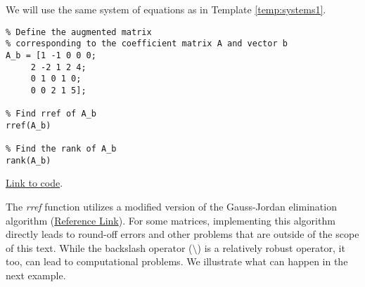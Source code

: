 \documentclass{ximera}
\begin{document}
\begin{template}\label{temp:rref}
We will use the same system of equations as in Template \ref{temp:systems1}.
    \begin{verbatim}
% Define the augmented matrix 
% corresponding to the coefficient matrix A and vector b
A_b = [1 -1 0 0 0;
     2 -2 1 2 4;
     0 1 0 1 0;
     0 0 2 1 5];
     
% Find rref of A_b
rref(A_b)

% Find the rank of A_b
rank(A_b)
    \end{verbatim}

\href{https://sagecell.sagemath.org/?z=eJxFjsEKwjAMhu-FvsN_Gehh0A49iYfB8CVEpOvSWWSt1Co-vumkmBCS_-cjSYOBnA-EfCOY17xQyDRhMTn5D2xMiZ6PGCYfZuS4UjaSc956JivXw4QJb7I5JoxS9NcRR5w1Wg1V8iAFSnRoO2huu-oo6F_9DYXC7C_VkaLByfMBfsYhOvB6KYrY8LSVgoUJ91V8ASwdNw8=&lang=octave&interacts=eJyLjgUAARUAuQ==}{Link to code}.    
\end{template}

\begin{warning}
    The \emph{rref} function utilizes a modified version of the Gauss-Jordan elimination algorithm (\href{https://www.mathworks.com/help/matlab/ref/rref.html}{Reference Link}).  For some matrices, implementing this algorithm directly leads to round-off errors and other problems that are outside of the scope of this text.  While the backslash operator ($\setminus$) is a relatively robust operator, it too, can lead to computational problems.  We illustrate what can happen in the next example.   
\end{warning}
\end{document}
